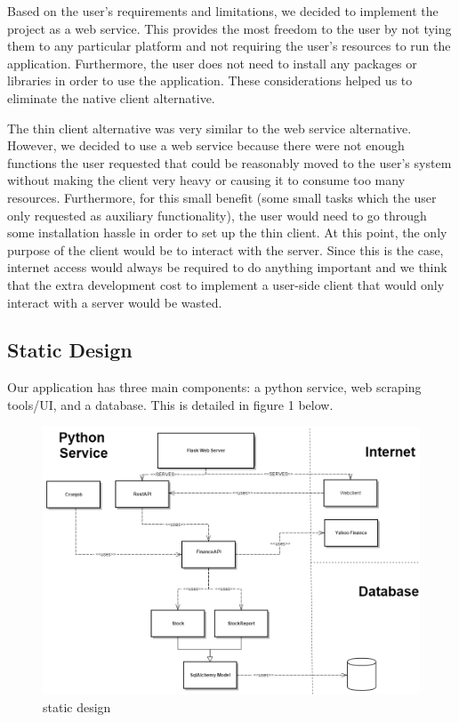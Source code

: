 \documentclass[12pt,a4paper]{article}
\begin{document}
Based on the user's requirements and limitations, we decided to implement the project as a web service. This provides the most freedom to the user  by not tying them to any particular platform and not requiring the user's resources  to run the application.  Furthermore, the user does not need to install any packages or libraries in order to use the application. These considerations helped us to eliminate the native client alternative. 
\vspace{.1cm}

\indent The thin client alternative was very similar to the web service alternative. However, we decided to use a web service because there were not enough functions the user requested that could be reasonably moved to the user's system without making the client very heavy or causing it to consume too many resources. Furthermore, for this small benefit (some small tasks which the user only requested as auxiliary functionality), the user would need to go through some installation hassle in order to set up the thin client. At this point, the only purpose of the client would be to interact with the server. Since this is the case, internet access would always be required to do anything important and we think that the extra development cost to implement a user-side client that would only interact with a server would be wasted.

\subsection{Static Design}

Our application has three main components: a python service, web scraping tools/UI, and a database. This is detailed in figure 1 below.

\begin{figure}[h!]
  \centering
  \includegraphics[scale=0.4]{stock_uml.png}
  \caption{static design}
\end{figure}
\end{document}
